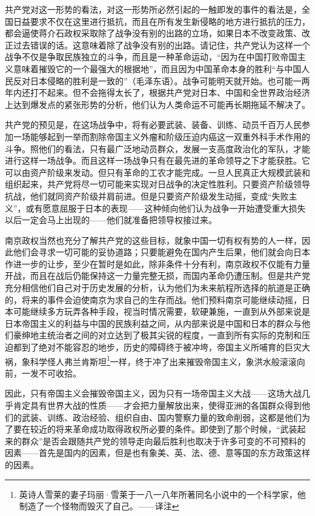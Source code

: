 \documentclass[10pt]{book}
\begin{document}
共产党对这一形势的看法，对这一形势所必然引起的一触即发的事件的看法是，全国日益要求不仅在这里进行抵抗，而且在所有发生新侵略的地方进行抵抗的压力，都会逼使蒋介石政权采取除了战争没有别的出路的立场，如果日本不改变政策、改正过去错误的话。这意味着除了战争没有别的出路。请记住，共产党认为这样一个战争不仅是争取民族独立的斗争，而且是一种革命运动，“因为在中国打败帝国主义意味着摧毁它的一个最强大的根据地”，而且因为中国革命本身的胜利“与中国人民反对日本侵略的胜利是一致的”（毛泽东语）。战争可能明天就开始。也可能一两年内还打不起来。但不会拖得太长了，根据共产党对日本、中国和全世界政治经济上达到爆发点的紧张形势的分析，他们认为人类命运不可能再长期拖延不解决了。

共产党的预见是，在这场战争中，将有必要武装、装备、训练、动员千百万人民参加一场能够起到一举而割除帝国主义外瘤和阶级压迫内癌这一双重外科手术作用的斗争。照他们的看法，只有最广泛地动员群众，发展一支高度政治化的军队，才能进行这样一场战争。而且这样一场战争只有在最先进的革命领导之下才能获胜。它可以由资产阶级来发动。但只有革命的工农才能完成。一旦人民真正大规模武装和组织起来，共产党将尽一切可能来实现对日战争的决定性胜利。只要资产阶级领导抗战，他们就同资产阶级并肩前进。但是只要资产阶级发生动摇，变成“失败主义”，或有愿意屈服于日本的表现——这种倾向他们认为战争一开始遭受重大损失以后一定会马上出现的——他们就准备把领导权接过来。

南京政权当然也充分了解共产党的这些目标，就象中国一切有权有势的人一样，因此他们会寻求一切可能的妥协道路；只要能避免在国内产生后果，他们就会向日本作进一步的让步，至少在暂时是如此，除非条件十分有利，南京政权不仅能有力量开战，而且在战后仍能保持这一力量完整无损，而国内革命仍遭压制。但是共产党充分相信他们自己对于历史发展的分析，认为他们为未来航程所选择的航道是正确的，将来的事件会迫使南京为求自己的生存而战。他们预料南京可能继续动摇，日本可能继续多方玩弄各种手段，视当时情况需要，软硬兼施，一直到从外部来说是日本帝国主义的利益与中国的民族利益之间，从内部来说是中国和日本的群众与他们豪绅地主统治者之间的对立达到了极其尖锐的程度，一直到所有实际的克制和压迫都到了绝对不能容忍的地步，历史的障碍终于被冲垮，帝国主义所哺育的巨灾大祸，象科学怪人弗兰肯斯坦\footnote{英诗人雪莱的妻子玛丽·雪莱于一八一八年所著同名小说中的一个科学家，他制造了一个怪物而毁灭了自己。——译注}一样，终于冲了出来摧毁帝国主义，象洪水般滚滚向前，一发不可收拾。

因此，只有帝国主义会摧毁帝国主义，因为只有一场帝国主义大战——这场大战几乎肯定具有世界大战的性质——才会把力量解放出来，使得亚洲的各国群众得到他们的武装、训练、政治经验、组织自由、国内警察力量的致命削弱，这都是他们为了要在较近的将来革命成功取得政权所必要的条件。即使到了那个时候，“武装起来的群众”是否会跟随共产党的领导走向最后胜利也取决于许多可变的不可预料的因素——首先是国内的因素，但是也有象美、英、法、德、意等国的东方政策这样的因素。
\end{document}

